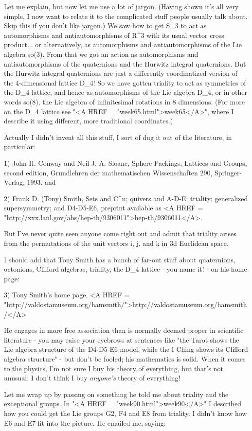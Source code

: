 Let me explain, but now let me use a lot of jargon.  (Having
shown it's all very simple, I now want to relate it to the
complicated stuff people usually talk about.  Skip this if
you don't like jargon.)  We saw how to get S_{3} to act as 
automorphisms and antiautomorphisms of R^{3} with its usual 
vector cross product... or alternatively, as automorphisms
and antiautomorphisms of the Lie algebra so(3).  From that
we got an action as automorphisms and antiautomorphisms of
the quaternions and the Hurwitz integral quaternions.  But
the Hurwitz integral quaternions are just a differently 
coordinatized version of the 4-dimensional lattice D_{4}!
So we have gotten triality to act as symmetries of the D_{4}
lattice, and hence as automorphisms of the Lie algebra D_{4},
or in other words so(8), the Lie algebra of infinitesimal 
rotations in 8 dimensions.  (For more on the D_{4} lattice see
"<A HREF = "week65.html">week65</A>", where I describe it using different, more traditional
coordinates.)

Actually I didn't invent all this stuff, I sort of dug
it out of the literature, in particular:

1)
John H. Conway and Neil J. A. Sloane, Sphere Packings, Lattices and
Groups, second edition, Grundlehren der mathematischen Wissenschaften
290, Springer-Verlag, 1993.
and

2) Frank D. (Tony) Smith, Sets and C^{n}; quivers and A-D-E; triality; 
generalized supersymmetry; and D4-D5-E6, preprint available as
<A HREF = "http://xxx.lanl.gov/abs/hep-th/9306011">hep-th/9306011</A>.

But I've never quite seen anyone come right out and admit
that triality arises from the permutations of the unit vectors
i, j, and k in 3d Euclidean space.

I should add that Tony Smith has a bunch of far-out stuff
about quaternions, octonions, Clifford algebras, triality,
the D_{4} lattice - you name it! - on his home page:


3) Tony Smith's home page, <A HREF =
"http://valdostamuseum.org/hamsmith/">http://valdostamuseum.org/hamsmith/</A>

He engages in more free association than is normally deemed
proper in scientific literature - you may raise your eyebrows at 
sentences like "the Tarot shows the Lie algebra structure of the 
D4-D5-E6 model, while the I Ching shows its Clifford algebra structure" 
- but don't be fooled; his mathematics is solid.  When it comes to the 
physics, I'm not sure I buy his theory of everything, but that's not 
unusual: I don't think I buy \emph{anyone's} theory of everything!

Let me wrap up by passing on something he told me about triality and the
exceptional groups.  In "<A HREF = "week90.html">week90</A>" I
described how you could get the Lie groups G2, F4 and E8 from triality.
I didn't know how E6 and E7 fit into the picture.  He emailed me,
saying:



